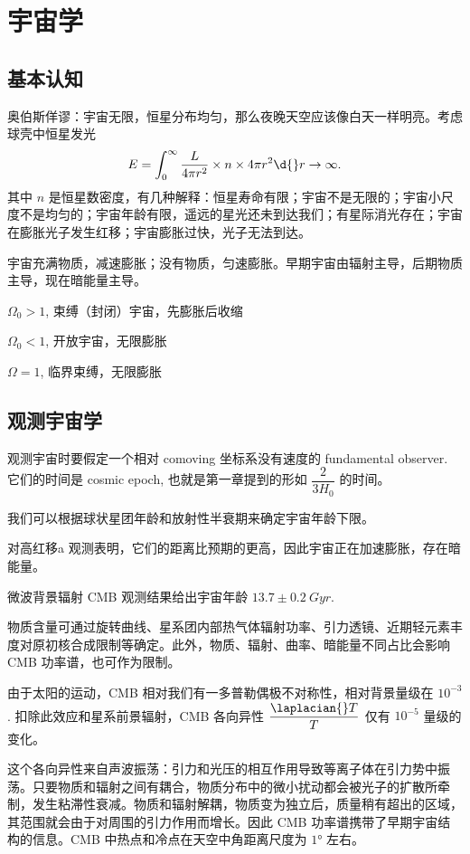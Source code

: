 \documentclass[../天体物理基础.tex]{subfiles}
\begin{document}
\section{宇宙学}
\subsection{基本认知}
奥伯斯佯谬：宇宙无限，恒星分布均匀，那么夜晚天空应该像白天一样明亮。考虑球壳中恒星发光
\begin{equation}
E=\int_{0}^{\infty}\frac{L}{4\pi r^{2}}\times n\times4\pi r^{2}\d{}r\to\infty.
\end{equation}
其中 $n$ 是恒星数密度，有几种解释：恒星寿命有限；宇宙不是无限的；宇宙小尺度不是均匀的；宇宙年龄有限，遥远的星光还未到达我们；有星际消光存在；宇宙在膨胀光子发生红移；宇宙膨胀过快，光子无法到达。

宇宙充满物质，减速膨胀；没有物质，匀速膨胀。早期宇宙由辐射主导，后期物质主导，现在暗能量主导。

$\Omega_{0}>1$, 束缚（封闭）宇宙，先膨胀后收缩

$\Omega_{0}<1$, 开放宇宙，无限膨胀

$\Omega=1$, 临界束缚，无限膨胀

\subsection{观测宇宙学}
观测宇宙时要假定一个相对 comoving 坐标系没有速度的 fundamental observer. 它们的时间是 cosmic epoch, 也就是第一章提到的形如 $\dfrac{2}{3H_{0}}$ 的时间。

我们可以根据球状星团年龄和放射性半衰期来确定宇宙年龄下限。

对高红移\uppercase\expandafter{}a 观测表明，它们的距离比预期的更高，因此宇宙正在加速膨胀，存在暗能量。

微波背景辐射 CMB 观测结果给出宇宙年龄 $13.7\pm\qty{0.2}{Gyr}$.

物质含量可通过旋转曲线、星系团内部热气体辐射功率、引力透镜、近期轻元素丰度对原初核合成限制等确定。此外，物质、辐射、曲率、暗能量不同占比会影响 CMB 功率谱，也可作为限制。

由于太阳的运动，CMB 相对我们有一多普勒偶极不对称性，相对背景量级在 $10^{-3}$. 扣除此效应和星系前景辐射，CMB 各向异性 $\dfrac{\laplacian{}T}{T}$ 仅有 $10^{-5}$ 量级的变化。

这个各向异性来自声波振荡：引力和光压的相互作用导致等离子体在引力势中振荡。只要物质和辐射之间有耦合，物质分布中的微小扰动都会被光子的扩散所牵制，发生粘滞性衰减。物质和辐射解耦，物质变为独立后，质量稍有超出的区域，其范围就会由于对周围的引力作用而增长。因此 CMB 功率谱携带了早期宇宙结构的信息。CMB 中热点和冷点在天空中角距离尺度为 $\ang{1;;}$ 左右。
\end{document}
